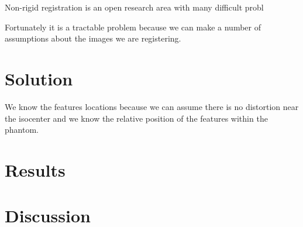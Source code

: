 \documentclass[12pt]{article}
\begin{document}
Non-rigid registration is an open research area with many difficult probl

Fortunately it is a tractable problem because we can make a number of assumptions about the images we are registering.

\section*{Solution}
  We know the features locations because we can assume there is no distortion near the isocenter and we know the relative position of the features within the phantom.

\section*{Results}

\section*{Discussion}



\end{document}

